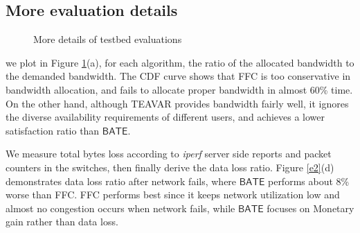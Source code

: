 \documentclass[sigconf]{acmart}
\begin{document}
\begin{appendices}
     \section{More evaluation details} \label{testbed-appendix}
     \begin{figure}
\centering
{}
\caption{More details of testbed evaluations}
\label{appendix -e1}
\end{figure}

we plot in Figure \ref{appendix -e1}(a), for each algorithm, the ratio of the allocated bandwidth 
to the demanded bandwidth. 
The CDF curve shows that FFC is too conservative in bandwidth allocation, 
and fails to allocate proper bandwidth in almost 60\% time.   
On the other hand, although TEAVAR provides bandwidth fairly well, 
it ignores the diverse availability requirements of different users, 
and achieves a lower satisfaction ratio than $\mathsf{BATE}$. 


We measure total bytes loss according to \textit{iperf} server side reports and packet counters in the switches, then finally derive the data loss ratio.
Figure \ref{e2}(d) demonstrates data loss ratio after network fails, where $\mathsf{BATE}$ performs about 8\% worse than FFC.
FFC performs best since it keeps network utilization low and almost no congestion occurs when network fails, 
while $\mathsf{BATE}$ focuses on Monetary gain rather than data loss.

\end{appendices}






\clearpage
\end{document}
